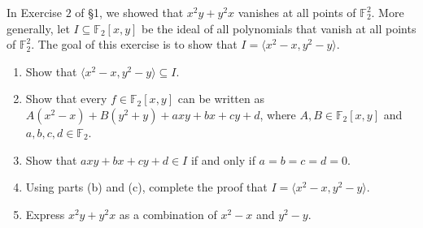 \begin{exercise}{13}
In Exercise $2$ of \S 1, we showed that $x^2 y + y^2 x$ vanishes at all points of $\mathbb{F}_2^2$. More generally, let $I\subseteq \mathbb{F}_2[x,y]$ be the ideal of all polynomials that vanish at all points of $\mathbb{F}_2^2$. The goal of this exercise is to show that $I = \langle x^2 - x, y^2 - y\rangle$.
\begin{enumerate}
    \item Show that $\langle x^2 - x, y^2 - y\rangle \subseteq I$.
    \item Show that every $f\in \mathbb{F}_2[x,y]$ can be written as $A(x^2 - x) + B(y^2 + y) + axy + bx + cy + d$, where $A,B\in \mathbb{F}_2[x,y]$ and $a,b,c,d\in \mathbb{F}_2$.
    \item Show that $axy + bx + cy + d\in I$ if and only if $a=b=c=d=0$.
    \item Using parts (b) and (c), complete the proof that $I = \langle x^2 - x, y^2- y\rangle$.
    \item Express $x^2 y + y^2 x$ as a combination of $x^2 - x$ and $y^2 - y$.
\end{enumerate}
\end{exercise}

